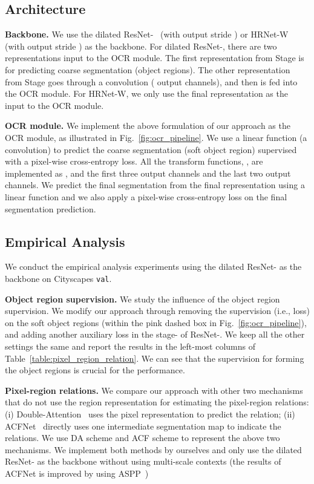 \documentclass[runningheads]{llncs}
\begin{document}
\subsection{Architecture}

\noindent\textbf{Backbone.}
We use the dilated ResNet-~\cite{he2016deep} (with output stride ) or HRNet-W~\cite{sun2019high} (with output stride ) as the backbone.
For dilated ResNet-, 
there are two representations input to the OCR module.
The first representation from Stage  
is for predicting coarse segmentation (object regions).
The other representation from Stage 
goes through a  convolution ( output channels),
and then is fed into the OCR module.
For HRNet-W, we only use the final representation as the input to 
the OCR module.

\noindent\textbf{OCR module.}
We implement the above formulation of our approach as the OCR module,
as illustrated in Fig.~\ref{fig:ocr_pipeline}.
We use a linear function (a  convolution)
to predict the coarse segmentation (soft object region) supervised with a
pixel-wise cross-entropy loss. 
All the transform functions,
,
are implemented as 
,
and the first three output  channels
and the last two output  channels.
We predict the final segmentation from the final representation
using a linear function and we also apply a pixel-wise cross-entropy loss
on the final segmentation prediction.


\subsection{Empirical Analysis}

We conduct the empirical analysis experiments using
the dilated ResNet- as
the backbone
on Cityscapes \texttt{val}.


\noindent\textbf{Object region supervision.}
We study the influence of the object region supervision.
We modify our approach through removing the supervision (i.e., loss)
on the soft object regions (within the {\color{carnationpink}pink} dashed box in Fig.~\ref{fig:ocr_pipeline}),
and adding 
another auxiliary loss in the stage- of ResNet-.
We keep all the other settings the same and report the results in
the left-most  columns of Table~\ref{table:pixel_region_relation}.
We can see that the supervision for forming the object regions
is crucial for the performance.

\noindent\textbf{Pixel-region relations.}
We compare our approach with other two mechanisms
that do not use the region representation
for estimating the pixel-region relations:
(i) Double-Attention~\cite{A2Net}
uses the pixel representation to
predict the relation;
(ii) ACFNet~\cite{Zhang_2019_ICCV}
directly uses one intermediate segmentation map
to indicate the relations.
We use DA scheme and ACF scheme to represent the
above two mechanisms.
We implement both methods by ourselves
and only use the dilated ResNet- as
the backbone
without using multi-scale contexts
(the results of ACFNet
is improved by using ASPP~\cite{Zhang_2019_ICCV})
\end{document}
